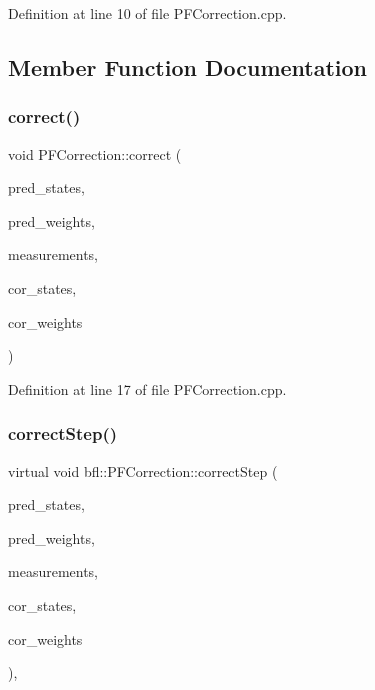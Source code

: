 Definition at line 10 of file P\+F\+Correction.\+cpp.



\subsection{Member Function Documentation}
\mbox{\label{classbfl_1_1PFCorrection_a7d8e7f910fe5ebcb7d8ed678c6f38836}} 
\subsubsection{\texorpdfstring{correct()}{correct()}}
{\footnotesize\ttfamily void P\+F\+Correction\+::correct (\begin{DoxyParamCaption}\item[{const Eigen\+::\+Ref$<$ const Eigen\+::\+Matrix\+Xf $>$ \&}]{pred\+\_\+states,  }\item[{const Eigen\+::\+Ref$<$ const Eigen\+::\+Vector\+Xf $>$ \&}]{pred\+\_\+weights,  }\item[{const Eigen\+::\+Ref$<$ const Eigen\+::\+Matrix\+Xf $>$ \&}]{measurements,  }\item[{Eigen\+::\+Ref$<$ Eigen\+::\+Matrix\+Xf $>$}]{cor\+\_\+states,  }\item[{Eigen\+::\+Ref$<$ Eigen\+::\+Vector\+Xf $>$}]{cor\+\_\+weights }\end{DoxyParamCaption})}



Definition at line 17 of file P\+F\+Correction.\+cpp.

\mbox{\label{classbfl_1_1PFCorrection_a3fb61b90d36bea3271c1c9e363c61229}} 
\subsubsection{\texorpdfstring{correct\+Step()}{correctStep()}}
{\footnotesize\ttfamily virtual void bfl\+::\+P\+F\+Correction\+::correct\+Step (\begin{DoxyParamCaption}\item[{const Eigen\+::\+Ref$<$ const Eigen\+::\+Matrix\+Xf $>$ \&}]{pred\+\_\+states,  }\item[{const Eigen\+::\+Ref$<$ const Eigen\+::\+Vector\+Xf $>$ \&}]{pred\+\_\+weights,  }\item[{const Eigen\+::\+Ref$<$ const Eigen\+::\+Matrix\+Xf $>$ \&}]{measurements,  }\item[{Eigen\+::\+Ref$<$ Eigen\+::\+Matrix\+Xf $>$}]{cor\+\_\+states,  }\item[{Eigen\+::\+Ref$<$ Eigen\+::\+Vector\+Xf $>$}]{cor\+\_\+weights }\end{DoxyParamCaption})\hspace{0.3cm}{\ttfamily [protected]}, {}}



